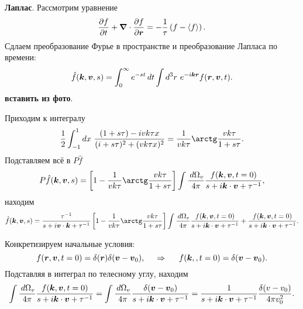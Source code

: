 \textbf{Лаплас}. Рассмотрим уравнение
\begin{equation*}
	\frac{\partial f}{\partial t}  + \boldsymbol{\nabla} \cdot \frac{\partial f}{\partial \boldsymbol{r}} = - \frac{1}{\tau}\left(
		f - \langle f\rangle
	\right).
\end{equation*}
Сдлаем преобразование Фурье в пространстве и преобразование Лапласа по времени:
\begin{equation*}
	\hat{f} (\boldsymbol{k}, \boldsymbol{v}, s) = \int_{0}^{\infty} e^{-st}\, d t \int d^3 r\ e^{- i \boldsymbol{k} \boldsymbol{r}} f(\boldsymbol{r}, \boldsymbol{v}, t).
\end{equation*}
\textbf{вставить из фото}.


Приходим к интегралу
\begin{equation*}
	\frac{1}{2} \int_{-1}^{1} dx\ \frac{(1+s \tau)  - i v k \tau x}{(i + s \tau)^2 + (v k \tau x)^2} = \frac{1}{v k \tau} \arctg \frac{v k \tau}{1+s \tau}.
\end{equation*}
Подставляем всё в $P \hat{f}$
\begin{equation*}
	P \hat{f}(\vc{k}, \vc{v}, s) = \left[
		1 - \frac{1}{vk\tau} \arctg \frac{v k \tau}{1 + s \tau}
	\right] \int \frac{\d \Omega_v}{4\pi} \frac{f(\vc{k}, \vc{v}, t=0)}{s + i \vc{k} \cdot \vc{v} + \tau^{-1}},
\end{equation*}
находим
\begin{equation*}
	\hat{f}(\vc{k}, \vc{v}, s) = \frac{\tau^{-1}}{s + i \vc{v} \cdot \vc{k} + \tau^{-1}} \left[
		1 - \frac{1}{vk\tau} \arctg \frac{v k \tau}{1 + s \tau}
	\right] \int \frac{\d \Omega_v}{4\pi} \frac{f(\vc{k}, \vc{v}, t=0)}{s + i \vc{k} \cdot \vc{v} + \tau^{-1}} +  \frac{f(\vc{k}, \vc{v}, t=0)}{s + i \vc{k} \cdot \vc{v} + \tau^{-1}}.
\end{equation*}


Конкретизируем начальные условия:
\begin{equation*}
	f(\boldsymbol{r}, \boldsymbol{v}, t=0) = \delta(\boldsymbol{r}) \delta(\boldsymbol{v}-\boldsymbol{v}_0),
	\hspace{0.5cm} \Rightarrow \hspace{0.5cm}
	f(\boldsymbol{k}, \boldsymbol{}, t=0) = \delta(\boldsymbol{v}-\boldsymbol{v}_0).
\end{equation*}
Подставляя в интеграл по телесному углу, находим
\begin{equation*}
	\int \frac{\, d \Omega_v}{4\pi}  \frac{f(\boldsymbol{k}, \boldsymbol{v}, t=0)}{s + i \boldsymbol{k} \cdot \boldsymbol{v} + \tau^{-1}} 
	= \int \frac{\, d \Omega_v}{4\pi} \frac{\delta(\boldsymbol{v} - \boldsymbol{v}_0)}{s + i \boldsymbol{k} \cdot \boldsymbol{v} + \tau^{-1}}
	= \frac{1}{s + i \boldsymbol{k} \cdot \boldsymbol{v} + \tau^{-1}} \frac{\delta(v-v_0)}{4 \pi v_0^2}.
\end{equation*}




